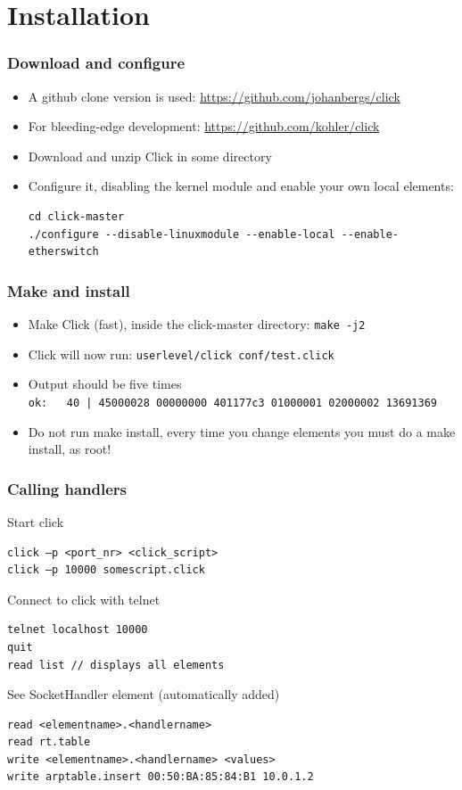 \documentclass{beamer}
\begin{document}
\section{Installation}
\begin{frame}[fragile]
\frametitle{Download and configure}
\begin{itemize}
	\item A github clone version is used: \url{https://github.com/johanbergs/click}
	\item For bleeding-edge development: \url{https://github.com/kohler/click}
	\item Download and unzip Click in some directory
	\item Configure it, disabling the kernel module and enable your own local elements:
	\begin{lstlisting}
cd click-master
./configure --disable-linuxmodule --enable-local --enable-etherswitch
\end{lstlisting}
\end{itemize}

\end{frame}
\begin{frame}[fragile]
	\frametitle{Make and install}
\begin{itemize}
	\item Make Click (fast), inside the click-master directory: \lstinline!make -j2!
	\item Click will now run: \lstinline!userlevel/click conf/test.click!
	\item Output should be five times \\ \lstinline!ok:   40 | 45000028 00000000 401177c3 01000001 02000002 13691369!
	\item Do not run make install, every time you change elements you must do a make install, as root!
\end{itemize}	
\end{frame}

\begin{frame}[fragile]
	\frametitle{Calling handlers}
Start click
\begin{verbatim}
click –p <port_nr> <click_script>
click –p 10000 somescript.click
\end{verbatim}
Connect to click with telnet
\begin{verbatim}
telnet localhost 10000
quit
read list // displays all elements
\end{verbatim}
See SocketHandler element (automatically added)
\begin{verbatim}
read <elementname>.<handlername>
read rt.table
write <elementname>.<handlername> <values>
write arptable.insert 00:50:BA:85:84:B1 10.0.1.2
\end{verbatim}
\end{frame}
\end{document}
